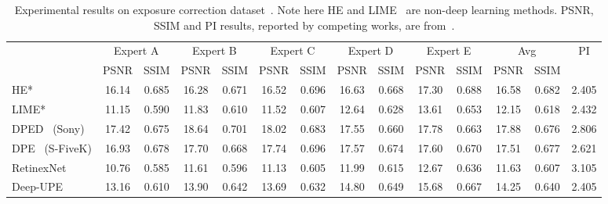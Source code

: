 \documentclass{bmvc2k}
\begin{document}
\begin{table}[t]
\caption{Experimental results on exposure correction dataset~\cite{Exposure_2021_CVPR}. Note here HE and LIME~\cite{LIME} are non-deep learning methods. PSNR, SSIM  and PI results, reported by competing works, are from~\cite{Exposure_2021_CVPR}.}
\centering
\setlength\tabcolsep{2pt}
\begin{adjustbox}{max width = 1\linewidth}
\begin{tabular}{l|cc|cc|cc|cc|cc|cc|c}
\Xhline{1.0pt}
\multirow{2}{*}{Method} & \multicolumn{2}{c|}{Expert A} & \multicolumn{2}{c|}{Expert B} & \multicolumn{2}{c|}{Expert C} & \multicolumn{2}{c|}{Expert D} & \multicolumn{2}{c|}{Expert E}      & \multicolumn{2}{c|}{Avg} & \multirow{2}{*}{PI} \\ \cline{2-13}
& PSNR & SSIM  & PSNR & SSIM          & PSNR & SSIM   & PSNR   & SSIM   & PSNR  & SSIM & PSNR& SSIM  & \\
\Xhline{0.6pt}
HE*~\cite{DIP}                      & 16.14         & 0.685         & 16.28         & 0.671         & 16.52         & 0.696         & 16.63         & 0.668         & 17.30 & 0.688 & 16.58       & 0.682      & 2.405               \\
LIME*~\cite{LIME}                    & 11.15         & 0.590          & 11.83         & 0.610         & 11.52         & 0.607         & 12.64         & 0.628         & 13.61 & 0.653 & 12.15       & 0.618      & 2.432               \\
DPED~\cite{DPED} (Sony)             & 17.42         & 0.675         & 18.64         & 0.701         & 18.02         & 0.683         & 17.55         & 0.660         & 17.78 & 0.663 & 17.88       & 0.676      & 2.806               \\
DPE~\cite{DPE_CVPR18} (S-FiveK)           & 16.93         & 0.678         & 17.70         & 0.668         & 17.74         & 0.696         & 17.57         & 0.674         & 17.60 & 0.670 & 17.51       & 0.677      & 2.621               \\
RetinexNet~\cite{LOL_dataset}              & 10.76         & 0.585         & 11.61         & 0.596         & 11.13         & 0.605         & 11.99         & 0.615         & 12.67 & 0.636 & 11.63       & 0.607      & 3.105               \\
Deep-UPE~\cite{DeepUPE_2019_CVPR}                & 13.16         & 0.610         & 13.90         & 0.642         & 13.69         & 0.632         & 14.80         & 0.649         & 15.68 & 0.667 & 14.25       & 0.640      & 2.405               \\ 

\end{tabular}
\end{adjustbox}
\end{table}
\end{document}
